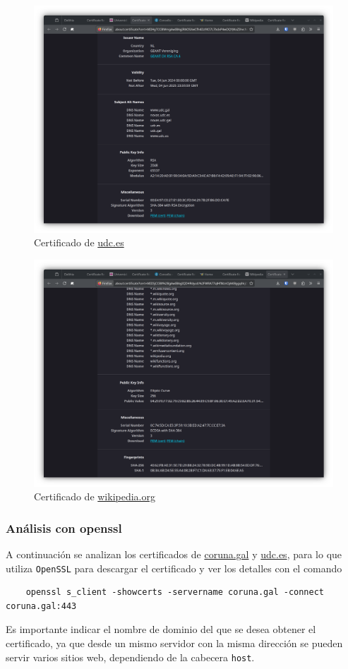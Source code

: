 \begin{figure}[H]
    \includegraphics[width=15cm]{cert-udc.png}
    \caption{Certificado de \url{udc.es}}
\end{figure}

\begin{figure}[H]
    \includegraphics[width=15cm]{cert-wikipedia.png}
    \caption{Certificado de \url{wikipedia.org}}
\end{figure}

\subsubsection{Análisis con openssl}

A continuación se analizan los certificados de \url{coruna.gal} y \url{udc.es}, para lo que utiliza \texttt{OpenSSL} para descargar el certificado y ver los detalles con el comando

\begin{verbatim}
    openssl s_client -showcerts -servername coruna.gal -connect coruna.gal:443
\end{verbatim}

Es importante indicar el nombre de dominio del que se desea obtener el certificado, ya que desde un mismo servidor con la misma dirección se pueden servir varios sitios web, dependiendo de la cabecera \texttt{host}.

